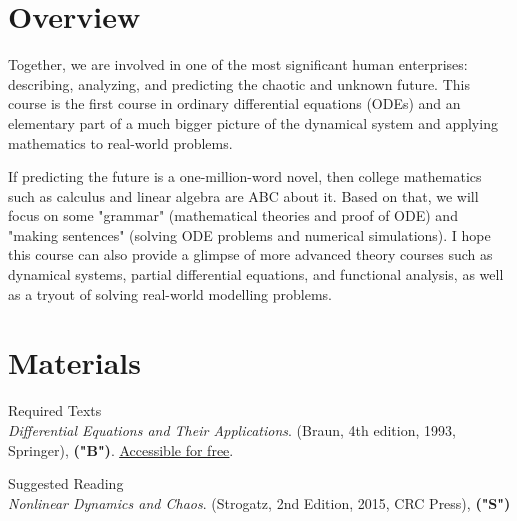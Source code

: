 \documentclass[letterpaper]{inzane_syllabus} %
\begin{document}

\makeprofile %

\section{Overview}
Together, we are involved in one of the most significant human enterprises: describing, analyzing, and predicting the chaotic and unknown future. This course is the first course in ordinary differential equations (ODEs) and an elementary part of a much bigger picture of the dynamical system and applying mathematics to real-world problems.

If predicting the future is a one-million-word novel, then college mathematics such as calculus and linear algebra are ABC about it. Based on that, we will focus on some "grammar" (mathematical theories and proof of ODE) and "making sentences" (solving ODE problems and numerical simulations). I hope this course can also provide a glimpse of more advanced theory courses such as dynamical systems, partial differential equations, and functional analysis, as well as a tryout of solving real-world modelling problems.

\vspace{0.5cm} %
\section{Materials}

{\color{myCOLOR} Required Texts}\\
\textit{Differential Equations and Their Applications}. (Braun, 4th edition, 1993, Springer), \textbf{("B")}. \href{https://link.springer.com/book/10.1007/978-1-4612-4360-1#toc}{\underline{Accessible for free}}.  

{\color{myCOLOR} Suggested Reading}\\
\textit{Nonlinear Dynamics and Chaos}. (Strogatz, 2nd Edition, 2015, CRC Press), \textbf{("S")} 
\end{document}

